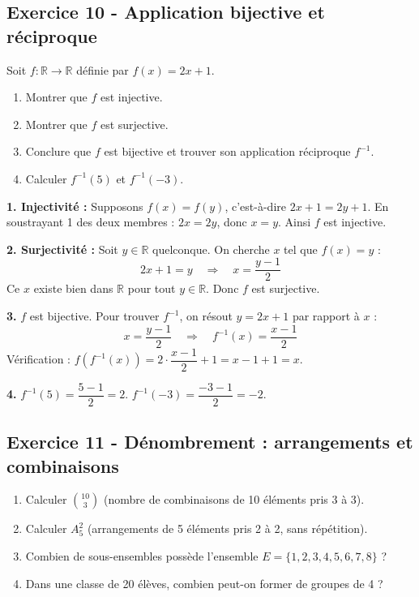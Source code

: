 \documentclass[12pt,a4paper]{article}
\begin{document}
\subsection*{Exercice 10 - Application bijective et réciproque \niveau{\moyen}}

\begin{boiteexercice}
Soit $f:\mathbb{R}\to\mathbb{R}$ définie par $f(x) = 2x+1$.
\begin{enumerate}
  \item Montrer que $f$ est injective.
  \item Montrer que $f$ est surjective.
  \item Conclure que $f$ est bijective et trouver son application réciproque $f^{-1}$.
  \item Calculer $f^{-1}(5)$ et $f^{-1}(-3)$.
\end{enumerate}
\end{boiteexercice}

\begin{boitecorrige}
\textbf{1. Injectivité :} Supposons $f(x) = f(y)$, c'est-à-dire $2x+1 = 2y+1$. En soustrayant 1 des deux membres : $2x = 2y$, donc $x = y$. Ainsi $f$ est injective.

\textbf{2. Surjectivité :} Soit $y\in\mathbb{R}$ quelconque. On cherche $x$ tel que $f(x) = y$ :
\[
2x+1 = y \quad \Rightarrow \quad x = \frac{y-1}{2}
\]
Ce $x$ existe bien dans $\mathbb{R}$ pour tout $y\in\mathbb{R}$. Donc $f$ est surjective.

\textbf{3.} $f$ est bijective. Pour trouver $f^{-1}$, on résout $y = 2x+1$ par rapport à $x$ :
\[
x = \frac{y-1}{2} \quad \Rightarrow \quad f^{-1}(x) = \frac{x-1}{2}
\]
Vérification : $f(f^{-1}(x)) = 2\cdot\dfrac{x-1}{2}+1 = x-1+1 = x$.

\textbf{4.}
$f^{-1}(5) = \dfrac{5-1}{2} = 2$.
$f^{-1}(-3) = \dfrac{-3-1}{2} = -2$.
\end{boitecorrige}

\subsection*{Exercice 11 - Dénombrement : arrangements et combinaisons \niveau{\moyen}}

\begin{boiteexercice}
\begin{enumerate}
  \item Calculer $\binom{10}{3}$ (nombre de combinaisons de 10 éléments pris 3 à 3).
  \item Calculer $A_5^2$ (arrangements de 5 éléments pris 2 à 2, sans répétition).
  \item Combien de sous-ensembles possède l'ensemble $E = \{1,2,3,4,5,6,7,8\}$ ?
  \item Dans une classe de 20 élèves, combien peut-on former de groupes de 4 ?
\end{enumerate}
\end{boiteexercice}
\end{document}
